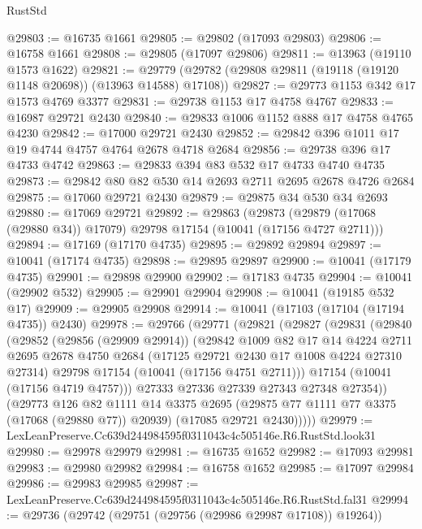 \begin{lexlean}{RustStd}
\begin{coremodule}
@29803 := @16735 @1661
@29805 := @29802 (@17093 @29803)
@29806 := @16758 @1661
@29808 := @29805 (@17097 @29806)
@29811 := @13963 (@19110 @1573 @1622)
@29821 := @29779 (@29782 (@29808 @29811 (@19118 (@19120 @1148 @20698)) (@13963 @14588) @17108))
@29827 := @29773 @1153 @342 @17 @1573 @4769 @3377
@29831 := @29738 @1153 @17 @4758 @4767
@29833 := @16987 @29721 @2430
@29840 := @29833 @1006 @1152 @888 @17 @4758 @4765 @4230
@29842 := @17000 @29721 @2430
@29852 := @29842 @396 @1011 @17 @19 @4744 @4757 @4764 @2678 @4718 @2684
@29856 := @29738 @396 @17 @4733 @4742
@29863 := @29833 @394 @83 @532 @17 @4733 @4740 @4735
@29873 := @29842 @80 @82 @530 @14 @2693 @2711 @2695 @2678 @4726 @2684
@29875 := @17060 @29721 @2430
@29879 := @29875 @34 @530 @34 @2693
@29880 := @17069 @29721
@29892 := @29863
    (@29873 (@29879 (@17068 (@29880 @34)) @17079) @29798 @17154 (@10041 (@17156 @4727 @2711)))
@29894 := @17169 (@17170 @4735)
@29895 := @29892 @29894
@29897 := @10041 (@17174 @4735)
@29898 := @29895 @29897
@29900 := @10041 (@17179 @4735)
@29901 := @29898 @29900
@29902 := @17183 @4735
@29904 := @10041 (@29902 @532)
@29905 := @29901 @29904
@29908 := @10041 (@19185 @532 @17)
@29909 := @29905 @29908
@29914 := @10041 (@17103 (@17104 (@17194 @4735)) @2430)
@29978 := @29766
    (@29771
      (@29821
        (@29827
          (@29831
            (@29840
              (@29852
                (@29856 (@29909 @29914))
                (@29842
                  @1009
                  @82
                  @17
                  @14
                  @4224
                  @2711
                  @2695
                  @2678
                  @4750
                  @2684
                  (@17125 @29721 @2430 @17 @1008 @4224 @27310 @27314)
                  @29798
                  @17154
                  (@10041 (@17156 @4751 @2711)))
                @17154
                (@10041 (@17156 @4719 @4757)))
              @27333
              @27336
              @27339
              @27343
              @27348
              @27354))
          (@29773
            @126
            @82
            @1111
            @14
            @3375
            @2695
            (@29875 @77 @1111 @77 @3375 (@17068 (@29880 @77)) @20939)
            (@17085 @29721 @2430)))))
@29979 := LexLeanPreserve.Cc639d244984595f0311043c4c505146e.R6.RustStd.look31
@29980 := @29978 @29979
@29981 := @16735 @1652
@29982 := @17093 @29981
@29983 := @29980 @29982
@29984 := @16758 @1652
@29985 := @17097 @29984
@29986 := @29983 @29985
@29987 := LexLeanPreserve.Cc639d244984595f0311043c4c505146e.R6.RustStd.fal31
@29994 := @29736 (@29742 (@29751 (@29756 (@29986 @29987 @17108)) @19264))

\end{coremodule}
\end{lexlean}
